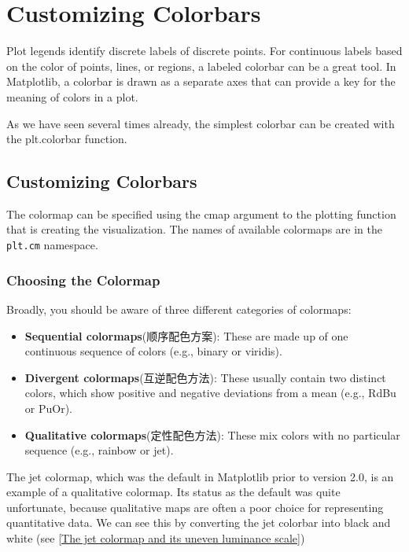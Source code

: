 \chapter{Customizing Colorbars\label{Ch30}}
Plot legends identify discrete labels of discrete points. For continuous labels based on
the color of points, lines, or regions, a labeled colorbar can be a great tool. In Matplotlib, a colorbar is drawn as a separate axes that can provide a key for the meaning
of colors in a plot.

As we have seen several times already, the simplest colorbar can be created with the
plt.colorbar function.

\section{Customizing Colorbars}
The colormap can be specified using the cmap argument to the plotting function that
is creating the visualization. The names of available colormaps are in the \verb|plt.cm| namespace.

\subsection*{Choosing the Colormap}
Broadly, you should be aware of three different categories of colormaps:
\begin{itemize}
    \item  \textbf{Sequential colormaps}(顺序配色方案): These are made up of one continuous sequence of colors (e.g., binary or
          viridis).
    \item  \textbf{Divergent colormaps}(互逆配色方法): These usually contain two distinct colors, which show positive and negative deviations from a mean (e.g., RdBu or PuOr).
    \item  \textbf{Qualitative colormaps}(定性配色方法): These mix colors with no particular sequence (e.g., rainbow or jet).
\end{itemize}

The jet colormap, which was the default in Matplotlib prior to version 2.0, is an
example of a qualitative colormap. Its status as the default was quite unfortunate,
because qualitative maps are often a poor choice for representing quantitative data.
We can see this by converting the jet colorbar into black and white (see \autoref{The jet colormap and its uneven luminance scale})

